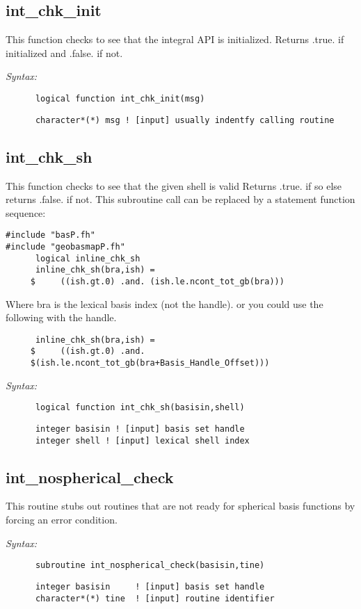 \subsection{int\_chk\_init} 
This function checks to see that the integral API is initialized. 
Returns .true. if initialized and .false. if not. 
 
{\it Syntax:} 
\begin{verbatim} 
      logical function int_chk_init(msg) 
\end{verbatim} 
\begin{verbatim} 
      character*(*) msg ! [input] usually indentfy calling routine 
\end{verbatim} 
\subsection{int\_chk\_sh} 
This function checks to see that the given shell is valid 
Returns .true. if so else returns .false. if not. 
This subroutine call can be replaced by a statement  
function sequence: 
\begin{verbatim} 
#include "basP.fh" 
#include "geobasmapP.fh" 
      logical inline_chk_sh 
      inline_chk_sh(bra,ish) = 
     $     ((ish.gt.0) .and. (ish.le.ncont_tot_gb(bra))) 
\end{verbatim} 
Where bra is the lexical basis index (not the handle). 
or you could use the following with the handle. 
\begin{verbatim} 
      inline_chk_sh(bra,ish) = 
     $     ((ish.gt.0) .and.  
     $(ish.le.ncont_tot_gb(bra+Basis_Handle_Offset))) 
\end{verbatim} 
 
{\it Syntax:} 
\begin{verbatim} 
      logical function int_chk_sh(basisin,shell) 
\end{verbatim} 
\begin{verbatim} 
      integer basisin ! [input] basis set handle 
      integer shell ! [input] lexical shell index 
\end{verbatim} 
\subsection{int\_nospherical\_check} 
This routine stubs out routines that are not ready for  
spherical basis functions by forcing an error condition. 
 
{\it Syntax:} 
\begin{verbatim} 
      subroutine int_nospherical_check(basisin,tine) 
\end{verbatim} 
\begin{verbatim} 
      integer basisin     ! [input] basis set handle 
      character*(*) tine  ! [input] routine identifier 
\end{verbatim} 
